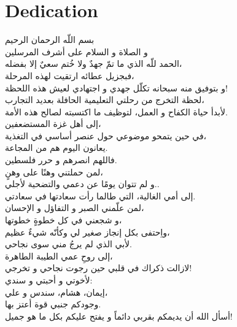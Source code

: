 \cleardoublepage
{}              %
\chapter*{\Huge\bfseries Dedication}
\thispagestyle{noheader}

\vspace{1cm}

\begin{RLtext}
بسم اللّه الرحمان الرحيم \\
و الصلاة و السلام على أشرف المرسلين \\[1em]

الحمد للّه الذي ما تمّ جهدٌ ولا خُتم سعيٌ إلا بفضله، \\
فبجزيل عطائه ارتقيت لهذه المرحلة، \\
و بتوفيق منه سبحانه تكلّل جهدي و اجتهادي لعيش هذه اللحظة! \\
لحظة التخرج من رحلتي التعليمية الحافلة بعديد التجارب، \\
لأبدأ حياة الكفاح و العمل، لتوظيف ما اكتسبته لصالح هذه الأمة. \\[2em]

إلى أهل غزة المستضعفين، \\
في حين يتمحو موضوعي حول عنصر أساسي في التغذية، \\
يعانون اليوم هم من المجاعة. \\
فاللهم انصرهم و حرر فلسطين. \\[2em]

لمن حملتني وهنًا على وهنٍ، \\
و لم تتوان يومًا عن دعمي والتضحية لأجلي.. \\
إلى أمي الغالية، التي طالما رأت سعادتها في سعادتي. \\[2em]

لمن علّمني الصبر و التفاؤل و الإحسان، \\
و شجعني في كل خطوةٍ خطوتها، \\
واِحتفى بكل إنجاز صغير لي وكأنّه شيءٌ عظيم، \\
لأبي الذي لم يرجُ مني سوى نجاحي. \\[2em]

إلى روحِ عمي الطيبة الطاهرة، \\
لازالت ذكراك في قلبي حين رجوت نجاحي و تخرجي! \\[2em]

لأخوتي و أحبتي و سندي: \\
إيمان، هشام، سندس و علي، \\
وجودكم جنبي قوة أعتز بها. \\
أسأل الله أن يديمكم بقربي دائماً و يفتح عليكم بكل ما هو جميل! \\[2em]


\end{RLtext}
